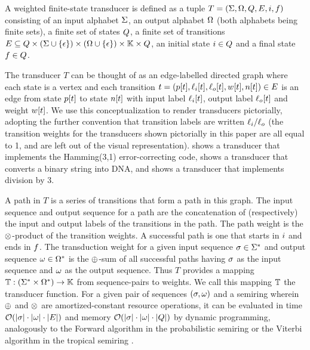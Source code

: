\documentclass[english]{article}
\begin{document}
A weighted finite-state transducer is defined as a tuple
$T = (\Sigma,\Omega,Q,E,i,f)$
consisting of an input alphabet $\Sigma$,
an output alphabet $\Omega$ (both alphabets being finite sets),
a finite set of states $Q$,
a finite set of transitions
$E \subseteq Q \times (\Sigma \cup \{ \epsilon \}) \times (\Omega \cup \{ \epsilon \}) \times \mathbb{K} \times Q$,
an initial state $i \in Q$
and a final state $f \in Q$.

The transducer $T$ can be thought of as an edge-labelled directed graph
where each state is a vertex
and each transition
$t = (p[t],\ell_i[t],\ell_o[t],w[t],n[t]) \in E$
is an edge from state $p[t]$ to state $n[t]$
with input label $\ell_i[t]$,
output label $\ell_o[t]$
and weight $w[t]$.
We use this conceptualization to render transducers pictorially,
adopting the further convention that transition labels are written $\ell_i{\tt /}\ell_o$
(the transition weights for the transducers shown pictorially in this paper are all equal to 1,
and are left out of the visual representation).
 shows a transducer that implements the Hamming(3,1) error-correcting code,
 shows a transducer that converts a binary string into DNA,
and
 shows a transducer that implements division by 3.

A path in $T$ is a series of transitions that form a path in this graph.
The input sequence and output sequence for a path are the concatenation of (respectively)
the input and output labels of the transitions in the path.
The path weight is the $\otimes$-product of the transition weights.
A successful path is one that starts in $i$ and ends in $f$.
The transduction weight for a given input sequence $\sigma \in {\Sigma}^{\ast}$
and output sequence $\omega \in {\Omega}^{\ast}$
is the $\oplus$-sum of all successful paths
having $\sigma$ as the input sequence
and $\omega$ as the output sequence.
Thus $T$ provides a mapping
$\mathbb{T}:({\Sigma}^{\ast} \times {\Omega}^{\ast}) \to \mathbb{K}$
from sequence-pairs to weights.
We call this mapping $\mathbb{T}$ the transducer function.
For a given pair of sequences $(\sigma,\omega)$
and a semiring wherein $\oplus$ and $\otimes$ are amortized-constant resource operations,
it can be evaluated in time ${\cal O}(|\sigma| \cdot |\omega| \cdot |E|)$
and memory ${\cal O}(|\sigma| \cdot |\omega| \cdot |Q|)$
by dynamic programming,
analogously to the Forward algorithm in the probabilistic semiring
or the Viterbi algorithm in the tropical semiring
\cite{Durbin98}.
\end{document}
